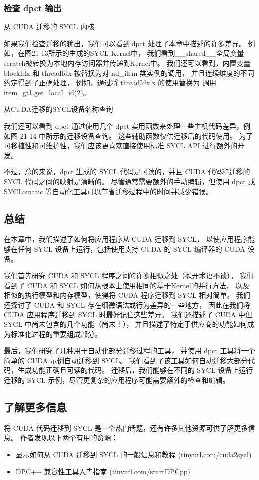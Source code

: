 \subsubsection{检查 dpct 输出}

{\color{red} 从 CUDA 迁移的 SYCL 内核}

如果我们检查迁移的输出，我们可以看到 dpct 处理了本章中描述的许多差异。 
例如，在图21-13所示的生成的SYCL Kernel中，
我们看到\_\_shared\_\_全局变量scratch被转换为本地内存访问器并传递到Kernel中。 
我们还可以看到，内置变量 blockIdx 和 threadIdx 被替换为对 nd\_item 类实例的调用，
并且连续维度的不同约定得到了正确处理，
例如，通过将 threadIdx.x 的使用替换为 调用 item\_gt1.get\_local\_id(2)。

{\color{red} 从CUDA迁移的SYCL设备名称查询}

我们还可以看到 dpct 通过使用几个 dpct 实用函数来处理一些主机代码差异，例如图 21-14 中所示的迁移设备查询。 
这些辅助函数仅供迁移后的代码使用。 为了可移植性和可维护性，我们应该更喜欢直接使用标准 SYCL API 进行额外的开发。

不过，总的来说，dpct 生成的 SYCL 代码是可读的，并且 CUDA 代码和迁移的 SYCL 代码之间的映射是清晰的。 
尽管通常需要额外的手动编辑，但使用 dpct 或 SYCLomatic 等自动化工具可以节省迁移过程中的时间并减少错误。

\subsection{总结}
在本章中，我们描述了如何将应用程序从 CUDA 迁移到 SYCL，
以使应用程序能够在任何 SYCL 设备上运行，包括使用支持 CUDA 的 SYCL 编译器的 CUDA 设备。

我们首先研究 CUDA 和 SYCL 程序之间的许多相似之处（抛开术语不谈）。 
我们看到了 CUDA 和 SYCL 如何从根本上使用相同的基于Kernel的并行方法，
以及相似的执行模型和内存模型，使得将 CUDA 程序迁移到 SYCL 相对简单。 
我们还探讨了 CUDA 和 SYCL 存在细微语法或行为差异的一些地方，
因此在我们将 CUDA 应用程序迁移到 SYCL 时最好记住这些差异。 
我们还描述了 CUDA 中但 SYCL 中尚未包含的几个功能（尚未！），
并且描述了特定于供应商的功能如何成为标准化过程的重要组成部分。

最后，我们研究了几种用于自动化部分迁移过程的工具，
并使用 dpct 工具将一个简单的 CUDA 示例自动迁移到 SYCL。 
我们看到了该工具如何自动迁移大部分代码，生成功能正确且可读的代码。 
迁移后，我们能够在不同的 SYCL 设备上运行迁移的 SYCL 示例，尽管更复杂的应用程序可能需要额外的检查和编辑。

\subsection{了解更多信息}
将 CUDA 代码迁移到 SYCL 是一个热门话题，还有许多其他资源可供了解更多信息。 作者发现以下两个有用的资源：

\begin{itemize}
	\item 显示如何从 CUDA 迁移到 SYCL 的一般信息和教程 (tinyurl.com/cuda2sycl)

	\item DPC++ 兼容性工具入门指南 (tinyurl.com/startDPCpp)
\end{itemize}